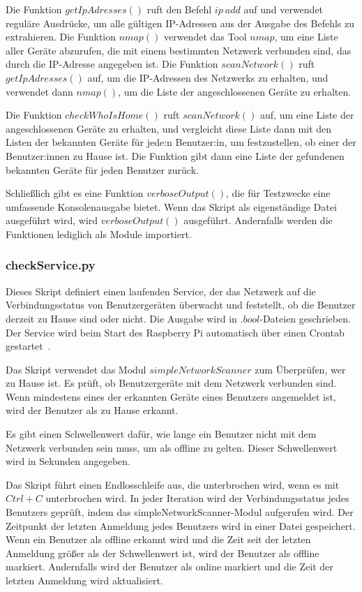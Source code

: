 \documentclass[12pt]{article}
\begin{document}
Die Funktion $getIpAdresses()$ ruft den Befehl $ip~add$ auf und verwendet reguläre Ausdrücke, um alle gültigen IP-Adressen aus der Ausgabe des Befehls zu extrahieren. Die Funktion $nmap()$ verwendet das Tool $nmap$, um eine Liste aller Geräte abzurufen, die mit einem bestimmten Netzwerk verbunden sind, das durch die IP-Adresse angegeben ist. Die Funktion $scanNetwork()$ ruft $getIpAdresses()$ auf, um die IP-Adressen des Netzwerks zu erhalten, und verwendet dann $nmap()$, um die Liste der angeschlossenen Geräte zu erhalten.

Die Funktion $checkWhoIsHome()$ ruft $scanNetwork()$ auf, um eine Liste der angeschlossenen Geräte zu erhalten, und vergleicht diese Liste dann mit den Listen der bekannten Geräte für jede:n Benutzer:in, um festzustellen, ob einer der Benutzer:innen zu Hause ist. Die Funktion gibt dann eine Liste der gefundenen bekannten Geräte für jeden Benutzer zurück.

Schließlich gibt es eine Funktion $verboseOutput()$, die für Testzwecke eine umfassende Konsolenausgabe bietet. Wenn das Skript als eigenständige Datei ausgeführt wird, wird $verboseOutput()$ ausgeführt. Andernfalls werden die Funktionen lediglich als Module importiert.

\subsubsection{checkService.py}

Dieses Skript definiert einen laufenden Service, der das Netzwerk auf die Verbindungsstatus von Benutzergeräten überwacht und feststellt, ob die Benutzer derzeit zu Hause sind oder nicht. Die Ausgabe wird in $.bool$-Dateien geschrieben. Der Service wird beim Start des Raspberry Pi automatisch über einen Crontab gestartet~\cite{crontab}.

Das Skript verwendet das Modul $simpleNetworkScanner$ zum Überprüfen, wer zu Hause ist. Es prüft, ob Benutzergeräte mit dem Netzwerk verbunden sind. Wenn mindestens eines der erkannten Geräte eines Benutzers angemeldet ist, wird der Benutzer als zu Hause erkannt.

Es gibt einen Schwellenwert dafür, wie lange ein Benutzer nicht mit dem Netzwerk verbunden sein muss, um als offline zu gelten. Dieser Schwellenwert wird in Sekunden angegeben.

Das Skript führt einen Endlosschleife aus, die unterbrochen wird, wenn es mit $Ctrl+C$ unterbrochen wird. In jeder Iteration wird der Verbindungsstatus jedes Benutzers geprüft, indem das simpleNetworkScanner-Modul aufgerufen wird. Der Zeitpunkt der letzten Anmeldung jedes Benutzers wird in einer Datei gespeichert. Wenn ein Benutzer als offline erkannt wird und die Zeit seit der letzten Anmeldung größer als der Schwellenwert ist, wird der Benutzer als offline markiert. Andernfalls wird der Benutzer als online markiert und die Zeit der letzten Anmeldung wird aktualisiert.
\end{document}
